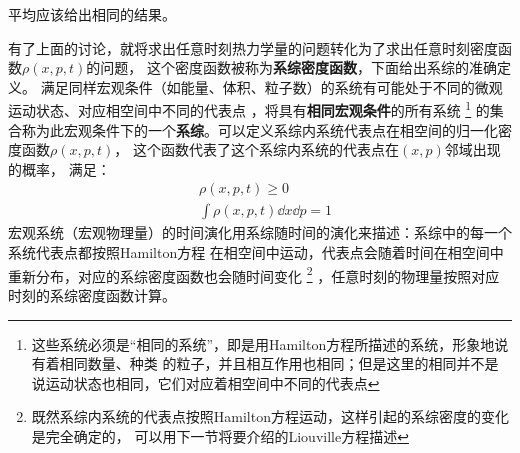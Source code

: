     平均应该给出相同的结果。
    \par 
    有了上面的讨论，就将求出任意时刻热力学量的问题转化为了求出任意时刻密度函数$\rho(x, p, t)$的问题，
    这个密度函数被称为\textbf{系综密度函数}，下面给出系综的准确定义。
    满足同样宏观条件（如能量、体积、粒子数）的系统有可能处于不同的微观运动状态、对应相空间中不同的代表点
    ，将具有\textbf{相同宏观条件}的所有系统
    \footnote{这些系统必须是“相同的系统”，即是用Hamilton方程所描述的系统，形象地说有着相同数量、种类
    的粒子，并且相互作用也相同；但是这里的相同并不是说运动状态也相同，它们对应着相空间中不同的代表点
    }
    的集合称为此宏观条件下的一个\textbf{系综}。可以定义系综内系统代表点在相空间的归一化密度函数$\rho(x, p, t)$，
    这个函数代表了这个系综内系统的代表点在$(x, p)$邻域出现的概率，
    满足：
    \begin{equation}
        \begin{split}
            &\rho(x, p, t) \geq 0\\
            &\int\rho(x, p, t)\dd x\dd p = 1
        \end{split}
        \label{ensemble density}
    \end{equation}
    宏观系统（宏观物理量）的时间演化用系综随时间的演化来描述：系综中的每一个系统代表点都按照Hamilton方程
    在相空间中运动，代表点会随着时间在相空间中重新分布，对应的系综密度函数也会随时间变化
    \footnote{既然系综内系统的代表点按照Hamilton方程运动，这样引起的系综密度的变化是完全确定的，
    可以用下一节将要介绍的Liouville方程描述}
    ，任意时刻的物理量按照对应时刻的系综密度函数计算。
